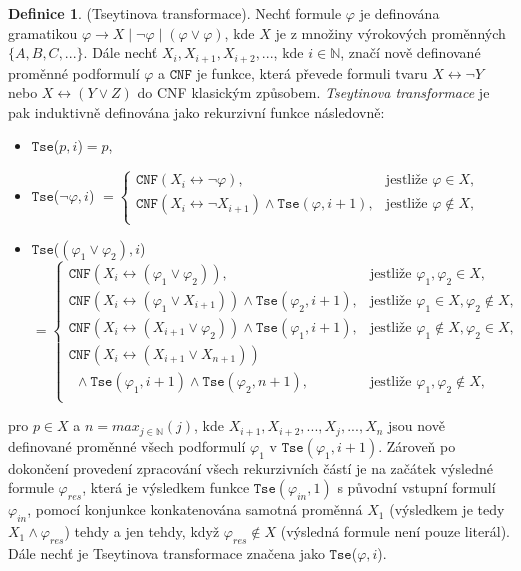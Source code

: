 \documentclass[a4paper, 12pt]{article}
\theoremstyle{definition}
\newtheorem{definition}{Definice}[section]
\theoremstyle{definition}
\theoremstyle{definition}
\theoremstyle{remark}
\theoremstyle{remark}
\theoremstyle{remark}
\theoremstyle{remark}
\begin{document}
\begin{definition}
    (Tseytinova transformace). Nechť formule $\varphi$ je definována gramatikou $\varphi \rightarrow X \; | \; \neg\varphi \; | \; (\varphi \lor \varphi)$, kde $X$ je z množiny výrokových proměnných $\{A, B, C, ...\}$. Dále nechť $X_{i}, X_{i+1}, X_{i+2}, ...$, kde $i \in \mathbb{N}$, značí nově definované proměnné podformulí $\varphi$ a $\texttt{CNF}$ je funkce, která převede formuli tvaru $X \leftrightarrow \neg Y$ nebo $X \leftrightarrow (Y \lor Z)$ do CNF klasickým způsobem. \textit{Tseytinova transformace} je pak induktivně definována jako rekurzivní funkce následovně:

    \begin{itemize}
        \item $\texttt{Tse}$($p, i$)$ = p$,
        \item $\texttt{Tse}$($\neg\varphi, i$) $= 
            \begin{cases}
            \texttt{CNF}(X_i \leftrightarrow \neg \varphi), & \text{jestliže } \varphi \in X,\\
            \texttt{CNF}(X_i \leftrightarrow \neg X_{i+1}) \wedge \texttt{Tse}(\varphi, i + 1), & \text{jestliže } \varphi \not\in X\text{,}\\
            \end{cases}$
        \item $\texttt{Tse}$($(\varphi_1 \lor \varphi_2), i$) $= 
            \begin{cases}
            \texttt{CNF}(X_i \leftrightarrow (\varphi_1 \lor \varphi_2)), & \text{jestliže } \varphi_1, \varphi_2 \in X,\\
            \texttt{CNF}(X_i \leftrightarrow (\varphi_1 \lor X_{i+1})) \wedge \texttt{Tse}(\varphi_2, i + 1), & \text{jestliže } \varphi_1 \in X, \varphi_2 \not\in X,\\
            \texttt{CNF}(X_i \leftrightarrow (X_{i+1} \lor \varphi_2)) \wedge \texttt{Tse}(\varphi_1, i + 1), & \text{jestliže } \varphi_1 \not\in X, \varphi_2 \in X,\\
            \texttt{CNF}(X_i \leftrightarrow (X_{i+1} \lor X_{n+1})) \\ \ \ \wedge \texttt{Tse}(\varphi_1, i + 1) \wedge \texttt{Tse}(\varphi_2, n + 1), & \text{jestliže } \varphi_1, \varphi_2 \not\in X,\\
            \end{cases}$
    \end{itemize}

    \noindent
     pro $p \in X$ a $n = max_{j\in \mathbb{N}}(j)$, kde $X_{i+1}, X_{i+2}, ..., X_{j}, ..., X_{n}$ jsou nově definované proměnné všech podformulí $\varphi_1$ v $\texttt{Tse}(\varphi_1, i + 1)$. Zároveň po dokončení provedení zpracování všech rekurzivních částí je na začátek výsledné formule $\varphi_{res}$, která je výsledkem funkce $\texttt{Tse}(\varphi_{in}, 1)$ s původní vstupní formulí $\varphi_{in}$, pomocí konjunkce konkatenována samotná proměnná $X_1$ (výsledkem je tedy $X_1 \wedge \varphi_{res}$) tehdy a jen tehdy, když $\varphi_{res} \not\in X$ (výsledná formule není pouze literál). Dále nechť je Tseytinova transformace značena jako $\texttt{Tse}$($\varphi, i$).
\end{definition}
\end{document}
